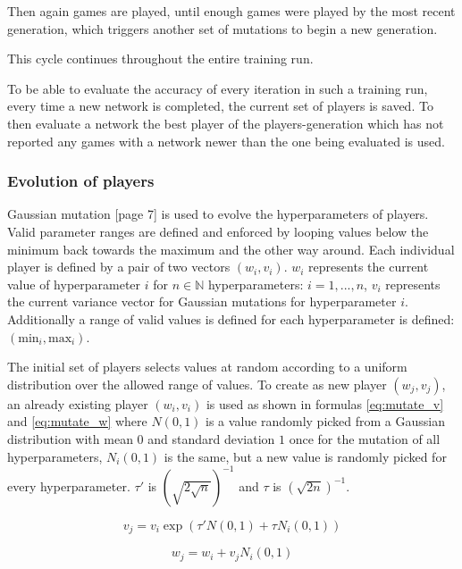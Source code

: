 \documentclass[12pt,onecolumn,oneside,titlepage]{article}
\begin{document}
Then again games are played, until enough games were played by the most recent generation, which triggers another set of mutations to begin a new generation.

This cycle continues throughout the entire training run.

To be able to evaluate the accuracy of every iteration in such a training run, every time a new network is completed, the current set of players is saved. 
To then evaluate a network the best player of the players-generation which has not reported any games with a network newer than the one being evaluated is used.

\subsubsection{Evolution of players}

Gaussian mutation \cite{yao1999evolving}[page 7] is used to evolve the hyperparameters of players. Valid parameter ranges are defined and enforced by looping values below the minimum back towards the maximum and the other way around.
Each individual player is defined by a pair of two vectors $(w_i, v_i)$. $w_i$ represents the current value of hyperparameter $i$ for $n \in \mathbb{N}$ hyperparameters: $i = 1, ..., n$, $v_i$ represents the current variance vector for Gaussian mutations for hyperparameter $i$.
Additionally a range of valid values is defined for each hyperparameter is defined: $(\text{min}_i, \text{max}_i)$.

The initial set of players selects values at random according to a uniform distribution over the allowed range of values.
To create as new player $(w_j, v_j)$, an already existing player $(w_i, v_i)$ is used as shown in formulas \ref{eq:mutate_v} and \ref{eq:mutate_w} where $N(0,1)$ is a value randomly picked from a Gaussian distribution with mean $0$ and standard deviation $1$
once for the mutation of all hyperparameters,
$N_i(0,1)$ is the same, but a new value is randomly picked for every hyperparameter. $\tau'$ is $(\sqrt{2\sqrt{n}})^{-1}$ and $\tau$ is $(\sqrt{2n})^{-1}$.

\begin{equation}
 v_j = v_i \exp (\tau'N(0,1) + \tau N_i(0, 1))\label{eq:mutate_v}
\end{equation}

\begin{equation}
 w_j = w_i + v_j N_i(0, 1)\label{eq:mutate_w}
\end{equation}
\end{document}
